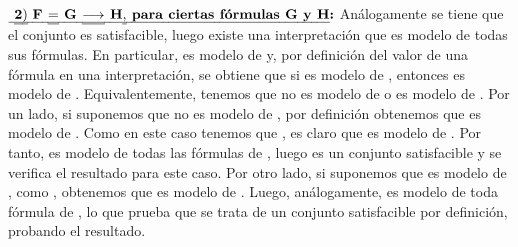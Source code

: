 \begin{isabellebody}
\begin{isamarkuptext}
\begin{demostracion}
      $\textbf{\isa{{\isasymtwo}{\isacharparenright}\ F\ {\isacharequal}\ G\ {\isasymlongrightarrow}\ H{\isacharcomma}\ para\ ciertas\ fórmulas\ G\ y\ H}:}$ Análogamente se tiene que el 
      conjunto  es satisfacible, luego existe una interpretación \isa{{\isasymA}} que es modelo de 
      todas sus fórmulas. En particular, \isa{{\isasymA}} es modelo de  y, por definición del valor de una 
      fórmula en una interpretación, se obtiene que si \isa{{\isasymA}} es modelo de , entonces es modelo de 
      . Equivalentemente, tenemos que \isa{{\isasymA}} no es modelo de  o \isa{{\isasymA}} es modelo de . Por un 
      lado, si suponemos que \isa{{\isasymA}} no es modelo de , por definición obtenemos que \isa{{\isasymA}} es modelo de 
      . Como en este caso tenemos que , es claro que \isa{{\isasymA}} es modelo de . Por 
      tanto, es modelo de todas las fórmulas de , luego es un conjunto satisfacible y 
      se verifica el resultado para este caso. Por otro lado, si suponemos que \isa{{\isasymA}} es modelo de , 
      como , obtenemos que \isa{{\isasymA}} es modelo de . Luego, análogamente, \isa{{\isasymA}} es modelo de toda
      fórmula de , lo que prueba que se trata de un conjunto satisfacible por
      definición, probando el resultado. 


\end{demostracion}
\end{isamarkuptext}
\end{isabellebody}
